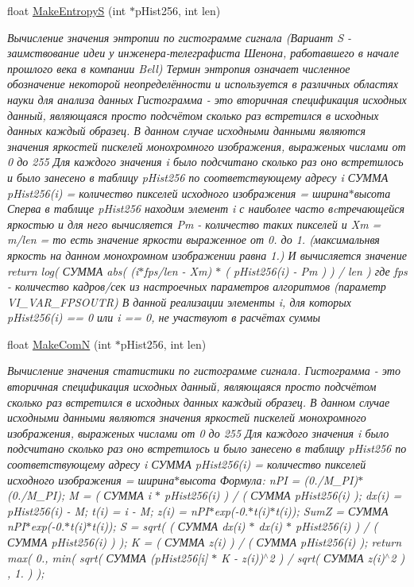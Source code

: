 \begin{DoxyCompactItemize}
float \hyperlink{class_c_v_i_engine_base_aa13baee159190df5a7fb94bb58f55065}{Make\+Entropy\+S} (int $\ast$p\+Hist256, int len)
\begin{DoxyCompactList}\small\item\em Вычисление значения энтропии по гистограмме сигнала (Вариант S -\/ заимствование идеи у инженера-\/телеграфиста Шенона, работавшего в начале прошлого века в компании Bell) Термин энтропия означает численное обозначение некоторой неопределённости и используется в различных областях науки для анализа данных Гистограмма -\/ это вторичная спецификация исходных данный, являющаяся просто подсчётом сколько раз встретился в исходных данных каждый образец. В данном случае исходными данными являются значения яркостей пискелей монохромного изображения, выраженых числами от 0 до 255 Для каждого значения i было подсчитано сколько раз оно встретилось и было занесено в таблицу p\+Hist256 по соответствующему адресу i СУММА p\+Hist256(i) = количество пикселей исходного изображения = ширина$\ast$высота Сперва в таблице p\+Hist256 находим элемент i с наиболее часто вcтречающейся яркостью и для него вычисляется Pm -\/ количество таких пикселей и Xm = m/len = то есть значение яркости выраженное от 0. до 1. (максимальнвя яркость на данном монохромном изображении равна 1.) И вычисляется значение return log( СУММА abs( (i$\ast$fps/len -\/ Xm) $\ast$ ( p\+Hist256(i) -\/ Pm ) ) / len ) где fps -\/ количество кадров/сек из настроечных параметров алгоритмов (параметр V\+I\+\_\+\+V\+A\+R\+\_\+\+F\+P\+S\+O\+U\+T\+R) В данной реализации элементы i, для которых p\+Hist256(i) == 0 или i == 0, не участвуют в расчётах суммы \end{DoxyCompactList}\item 
float \hyperlink{class_c_v_i_engine_base_a4bde6b4202b8dfa683becb522949e09c}{Make\+Com\+N} (int $\ast$p\+Hist256, int len)
\begin{DoxyCompactList}\small\item\em Вычисление значения статистики по гистограмме сигнала. Гистограмма -\/ это вторичная спецификация исходных данный, являющаяся просто подсчётом сколько раз встретился в исходных данных каждый образец. В данном случае исходными данными являются значения яркостей пискелей монохромного изображения, выраженых числами от 0 до 255 Для каждого значения i было подсчитано сколько раз оно встретилось и было занесено в таблицу p\+Hist256 по соответствующему адресу i СУММА p\+Hist256(i) = количество пикселей исходного изображения = ширина$\ast$высота Формула\+: n\+P\+I = (0./\+M\+\_\+\+P\+I)$\ast$(0./\+M\+\_\+\+P\+I); M = ( СУММА i $\ast$ p\+Hist256(i) ) / ( СУММА p\+Hist256(i) ); dx(i) = p\+Hist256(i) -\/ M; t(i) = i -\/ M; z(i) = n\+P\+I$\ast$exp(-\/0.$\ast$t(i)$\ast$t(i)); Sum\+Z = СУММА n\+P\+I$\ast$exp(-\/0.$\ast$t(i)$\ast$t(i)); S = sqrt( ( СУММА dx(i) $\ast$ dx(i) $\ast$ p\+Hist256(i) ) / ( СУММА p\+Hist256(i) ) ); K = ( СУММА z(i) ) / ( СУММА p\+Hist256(i) ); return max( 0., min( sqrt( СУММА (p\+Hist256\mbox{[}i\mbox{]} $\ast$ K -\/ z(i))$^\wedge$2 ) / sqrt( СУММА z(i)$^\wedge$2 ) , 1. ) ); \end{DoxyCompactList}\item 

\end{DoxyCompactItemize}
